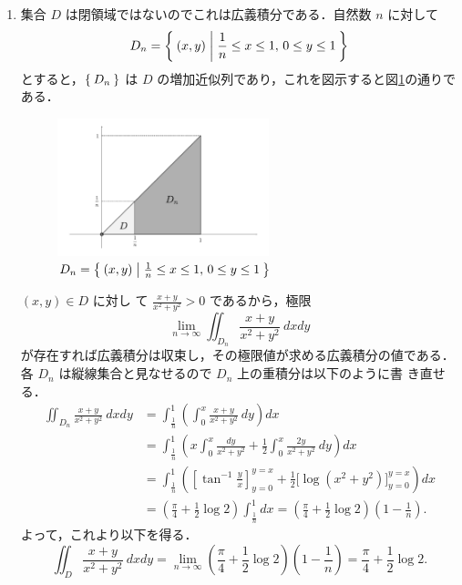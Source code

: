 \documentclass[11pt, uplatex, dvipdfmx]{jsarticle}
\begin{document}
\begin{enumerate}[(1)]
   \item 集合 $D$ は閉領域ではないのでこれは広義積分である．自然数 $n$ に対して
     \[
       D_n=\Set{ (x,y) | \frac{1}{n} \leq x \leq 1, \, 0 \leq y \leq 1}
     \]
     とすると，$\Set{D_n}$ は $D$ の増加近似列であり，これを図示すると図\ref{fig:no19}の通りである．
     \begin{figure}[h]
       \centering
       \includegraphics[height=4cm]{./pictures/no19.pdf}
       \caption{ $D_n=\Set{(x,y)  |  \frac{1}{n} \leq x \leq 1, \, 0 \leq y \leq 1}$}\label{fig:no19}
     \end{figure}
     
     $(x,y) \in D$ に対し
     て $\frac{x+y}{x^2+y^2} >0$ であるから，極限
     \[
       \lim_{n \to \infty} \iint_{D_n} \frac{x+y}{x^2+y^2} \ dx dy
     \]
     が存在すれば広義積分は収束し，その極限値が求める広義積分の値である．
     各 $D_n$ は縦線集合と見なせるので $D_n$ 上の重積分は以下のように書
     き直せる．
     \begin{align*}
       \iint_{D_n} \frac{x+y}{x^2+y^2} \ dx dy
       &= \int_{\frac{1}{n}}^{1}\left( \int_{0}^{x} \frac{x+y}{x^2+y^2} \ dy \right) dx\\
       &= \int_{\frac{1}{n}}^{1} \left( x \int_{0}^{x} \frac{dy}{x^2+y^2} 
         + \frac{1}{2} \int_{0}^{x} \frac{2y}{x^2+y^2}\ dy\right) dx\\
       &= \int_{\frac{1}{n}}^{1}\left(\left[ \tan^{-1}\frac{y}{x}\right]_{y=0}^{y=x} 
         + \frac{1}{2} \Big[ \log(x^2+y^2) \Big]_{y=0}^{y=x} \right) dx\\
       &=\left(\frac{\pi}{4} + \frac{1}{2}\log 2 \right)\int_{\frac{1}{n}}^{1} dx
       = \left( \frac{\pi}{4}+\frac{1}{2}\log 2\right) \left( 1-\frac{1}{n}\right).
     \end{align*}
     よって，これより以下を得る．
     \[
       \iint_{D}\frac{x+y}{x^2+y^2} \ dx dy 
       = \lim_{n \to \infty} \left( \frac{\pi}{4}+\frac{1}{2}\log 2\right)\left(1-\frac{1}{n}\right)
       =\frac{\pi}{4}+\frac{1}{2}\log 2.
     \]
       

\end{enumerate}
\end{document}
